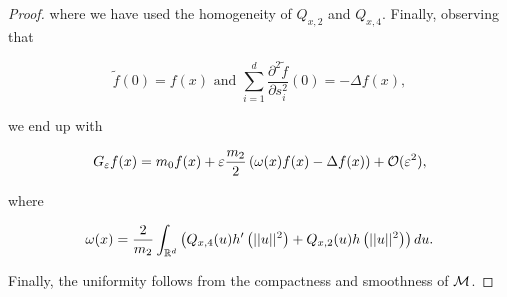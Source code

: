 \begin{proof}
where we have used the homogeneity of $Q_{x,2}$ and $Q_{x,4}$. Finally, observing that

\begin{equation*}
\tilde{f}(0) = f(x) \text{ and } \sum_{i=1}^d \frac{\partial^2 \tilde{f}}{\partial s_i^2}(0) = -\Delta f(x),
\end{equation*}

we end up with

\begin{equation*}
G_\varepsilon f(x)=m_0 f(x)+\varepsilon\frac{m_2}{2}\left(\omega(x)f(x)-\Delta f(x) \right)+\mathcal{O}(\varepsilon^2),
\end{equation*}

where

\begin{equation*}
\omega(x)=\frac{2}{m_2}\int_{\mathbb{R}^d}\left(Q_{x,4}(u)h'\left(||u||^2 \right) + Q_{x,2}(u)h\left(||u||^2 \right) \right)du.
\end{equation*}

Finally, the uniformity follows from the compactness and smoothness of $\mathcal{M}$.
\end{proof}



























